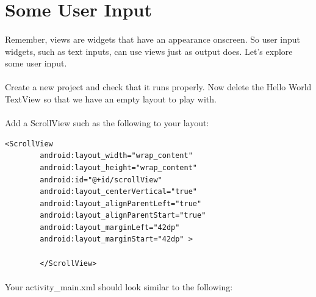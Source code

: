

\section{Some User Input}
\paragraph{} Remember, views are widgets that have an appearance onscreen. So user input widgets, such as text inputs, can use views just as output does. Let's explore some user input.

\paragraph{} Create a new project and check that it runs properly. Now delete the Hello World TextView so that we have an empty layout to play with.

\paragraph{} Add a ScrollView such as the following to your layout:

\begin{lstlisting}
<ScrollView
        android:layout_width="wrap_content"
        android:layout_height="wrap_content"
        android:id="@+id/scrollView"
        android:layout_centerVertical="true"
        android:layout_alignParentLeft="true"
        android:layout_alignParentStart="true"
        android:layout_marginLeft="42dp"
        android:layout_marginStart="42dp" >

        </ScrollView>
\end{lstlisting}

\paragraph{} Your activity\_main.xml should look similar to the following:

